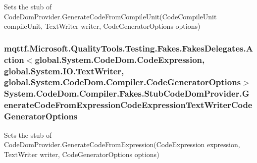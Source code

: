 Sets the stub of Code\-Dom\-Provider.\-Generate\-Code\-From\-Compile\-Unit(\-Code\-Compile\-Unit compile\-Unit, Text\-Writer writer, Code\-Generator\-Options options)

\hypertarget{class_system_1_1_code_dom_1_1_compiler_1_1_fakes_1_1_stub_code_dom_provider_a634eb89aa8061fc6b9c920f3343eb2a2}{
\subsubsection[{Generate\-Code\-From\-Expression\-Code\-Expression\-Text\-Writer\-Code\-Generator\-Options}]{\setlength{\rightskip}{0pt plus 5cm}mqttf.\-Microsoft.\-Quality\-Tools.\-Testing.\-Fakes.\-Fakes\-Delegates.\-Action$<$global.\-System.\-Code\-Dom.\-Code\-Expression, global.\-System.\-I\-O.\-Text\-Writer, global.\-System.\-Code\-Dom.\-Compiler.\-Code\-Generator\-Options$>$ System.\-Code\-Dom.\-Compiler.\-Fakes.\-Stub\-Code\-Dom\-Provider.\-Generate\-Code\-From\-Expression\-Code\-Expression\-Text\-Writer\-Code\-Generator\-Options}}\label{class_system_1_1_code_dom_1_1_compiler_1_1_fakes_1_1_stub_code_dom_provider_a634eb89aa8061fc6b9c920f3343eb2a2}


Sets the stub of Code\-Dom\-Provider.\-Generate\-Code\-From\-Expression(\-Code\-Expression expression, Text\-Writer writer, Code\-Generator\-Options options)

